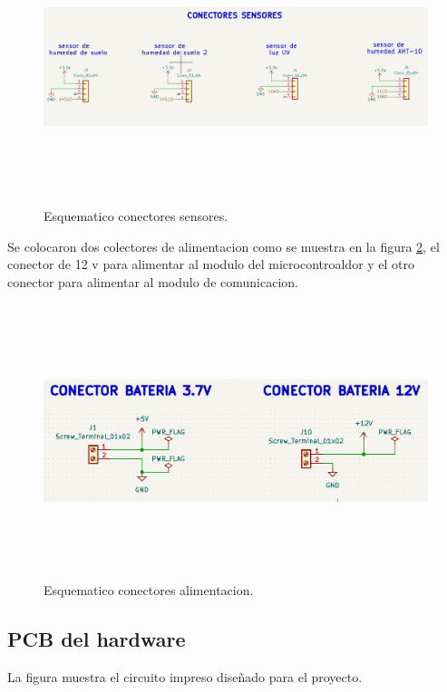 \begin{figure}[h]
  \centering
	\includegraphics[width=\textwidth, height=8cm]{./Figures/esquematico_conectores_sensores.png}
	\caption{Esquematico conectores sensores.}
	\label{fig:esquematico conectores sensores}
\end{figure}

Se colocaron dos colectores de alimentacion como se muestra en la figura \ref{fig:esquematico conectores alimentacion}, el conector de 12 v para alimentar al modulo del microcontroaldor y el otro conector para alimentar al modulo de comunicacion.
\begin{figure}[h]
  \centering
	\includegraphics[width=\textwidth, height=8cm]{./Figures/esquematico_alimentacion.png}
	\caption{Esquematico conectores alimentacion.}
	\label{fig:esquematico conectores alimentacion}
\end{figure}
\clearpage
\subsection{PCB del hardware} 
La figura muestra el circuito impreso diseñado para el proyecto.

